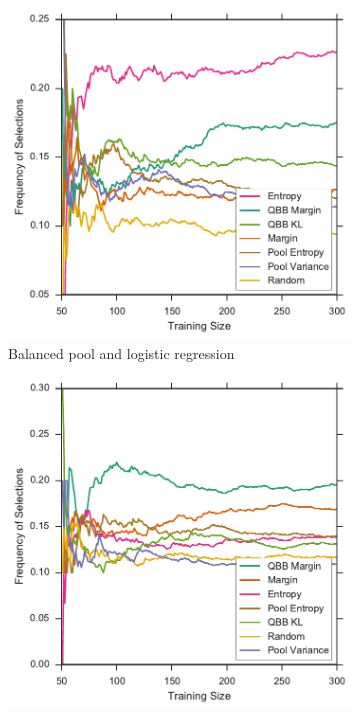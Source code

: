 \begin{figure}[p]
	\centering
	\begin{subfigure}{.5\textwidth}
		\centering
		\includegraphics[width=\textwidth]{figures/5_thompson/vstatlas_bl_frequencies}
		\caption{Balanced pool and logistic regression}
		\label{fig:vstatlas_bl_frequencies}
	\end{subfigure}%
	\begin{subfigure}{.5\textwidth}
		\centering
		\includegraphics[width=\linewidth]{figures/5_thompson/vstatlas_br_frequencies}

\end{subfigure}
\end{figure}

